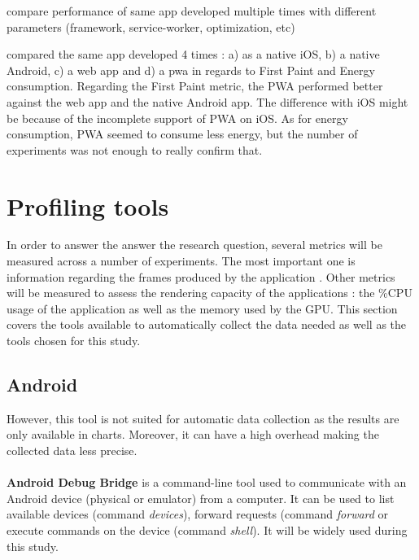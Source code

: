     \cite{PWADatabase} compare performance of same app developed multiple times with different parameters (framework, service-worker, optimization, etc)
    
    \cite{PWAapplicability} compared the same app developed 4 times : a) as a native iOS, b) a native Android, c) a web app and d) a pwa in regards to First Paint and Energy consumption. Regarding the First Paint metric, the PWA performed better against the web app and the native Android app. The difference with iOS might be because of the incomplete support of PWA on iOS. As for energy consumption, PWA seemed to consume less energy, but the number of experiments was not enough to really confirm that.

\section{Profiling tools}

In order to answer the answer the research question, several metrics will be measured across a number of experiments. The most important one is information regarding the frames produced by the application
. Other metrics will be measured to assess the rendering capacity of the applications : the \%CPU usage of the application as well as the memory used by the GPU. This section covers the tools available to automatically collect the data needed as well as the tools chosen for this study.  


\subsection{Android}
However, this tool is not suited for automatic data collection as the results are only available in charts. Moreover, it can have a high overhead \cite{nanoscope} making the collected data less precise.

\paragraph{}
\textbf{Android Debug Bridge} \cite{adb} is a command-line tool used to communicate with an Android device (physical or emulator) from a computer. It can be used to list available devices (command \textit{devices}), forward requests (command \textit{forward} or execute commands on the device (command \textit{shell}). It will be widely used during this study. 

